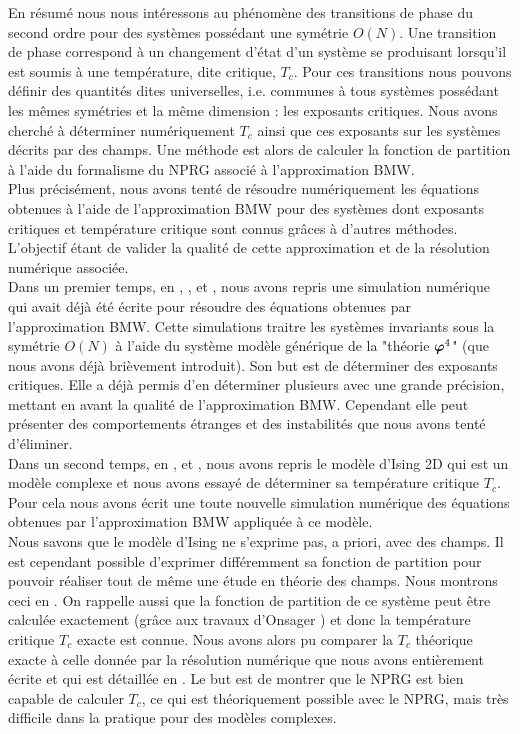 \documentclass[10.5pt]{article}
\begin{document}
\begin{multicols*}{2}
En résumé nous nous intéressons au phénomène des transitions de phase du second ordre pour des systèmes possédant une symétrie $O(N)$. Une transition de phase correspond à un changement d'état d'un système se produisant lorsqu'il est soumis à une température, dite critique, $T_c$. Pour ces transitions nous pouvons définir des quantités dites universelles, i.e. communes à tous systèmes possédant les mêmes symétries et la même dimension : les exposants critiques. Nous avons cherché à déterminer numériquement $T_c$ ainsi que ces exposants sur les systèmes décrits par des champs. Une méthode est alors de calculer la fonction de partition à l'aide du formalisme du NPRG associé à l'approximation BMW. \\


Plus précisément, nous avons tenté de résoudre numériquement les équations obtenues à l'aide de l'approximation BMW pour des systèmes dont exposants critiques et température critique sont connus grâces à d'autres méthodes. L'objectif étant de valider la qualité de cette approximation et de la résolution numérique associée.\\


Dans un premier temps, en , , et , nous avons repris une simulation numérique \cite{LeonardThesis} qui avait déjà été écrite pour résoudre des équations obtenues par l'approximation BMW. Cette simulations traitre les systèmes invariants sous la symétrie $O(N)$ à l'aide du système modèle générique de la "théorie $\boldsymbol{ \varphi}^4$" (que nous avons déjà brièvement introduit). Son but est de déterminer des exposants critiques. Elle a déjà permis d'en déterminer plusieurs avec une grande précision, mettant en avant la qualité de l'approximation BMW. Cependant elle peut présenter des comportements étranges et des instabilités que nous avons tenté d'éliminer. \\

Dans un second temps, en ,  et , nous avons repris le modèle d'Ising 2D qui est un modèle complexe et nous avons essayé de déterminer sa température critique $T_c$. Pour cela nous avons écrit une toute nouvelle simulation numérique des équations obtenues par l'approximation BMW appliquée à ce modèle. \\
\indent
Nous savons que le modèle d'Ising ne s'exprime pas, a priori, avec des champs. Il est cependant possible d'exprimer différemment sa fonction de partition pour pouvoir réaliser tout de même une étude en théorie des champs. Nous montrons ceci en . On rappelle aussi que la fonction de partition de ce système peut être calculée exactement (grâce aux travaux d'Onsager \cite{Onsager}) et donc la température critique $T_c$ exacte est connue. Nous avons alors pu comparer la $T_c$ théorique exacte à celle donnée par la résolution numérique que nous avons entièrement écrite et qui est détaillée en . Le but est de montrer que le NPRG est bien capable de calculer $T_c$, ce qui est théoriquement possible avec le NPRG, mais très difficile dans la pratique pour des modèles complexes.\\



\end{multicols*}
\end{document}
